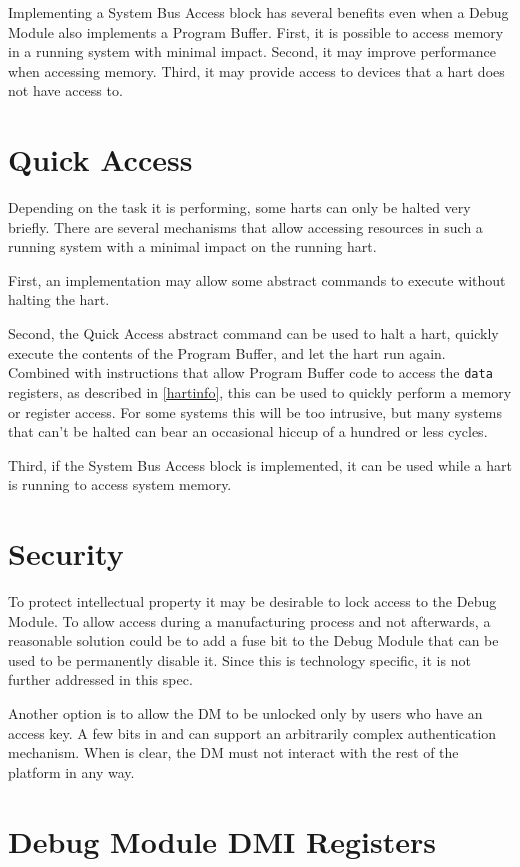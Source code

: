 \begin{commentary}
Implementing a System Bus Access block has several benefits even
when a Debug Module also implements a Program Buffer. 
First, it is possible to
access memory in a running system with minimal impact.  Second, it may improve
performance when accessing memory.
Third, it may provide
access to devices that a hart does not have access to.
\end{commentary}

\section{Quick Access}

Depending on the task it is performing, some harts can only be halted very briefly.
There are several mechanisms that allow accessing resources in such a running system
with a minimal impact on the running hart.

First, an implementation may allow some abstract commands to execute without halting the hart.

Second, the Quick Access abstract command can be used to halt a hart, quickly
execute the contents of the Program Buffer, and let the hart run again.
Combined with instructions that allow Program Buffer code to access the
{\tt data} registers, as described in \ref{hartinfo}, this can be used to quickly
perform a memory or register access. For some systems this will be too
intrusive, but many systems that can't be halted can bear an occasional hiccup
of a hundred or less cycles.

Third, if the System Bus Access block is implemented, it can be used while a
hart is running to access system memory.

\section{Security}

To protect intellectual property it may be desirable to lock access to the
Debug Module.  To allow access during a manufacturing process and not
afterwards, a reasonable solution could be to add a fuse bit to the Debug
Module that can be used to be permanently disable it. Since this is technology
specific, it is not further addressed in this spec.

Another option is to allow the DM to be unlocked only by users who have an
access key. A few bits in \Rdmstatus and \Rauthdata can support an arbitrarily
complex authentication mechanism.  When \Fauthenticated is clear, the DM must
not interact with the rest of the platform in any way.

\section{Debug Module DMI Registers} \label{dmdebbus}


